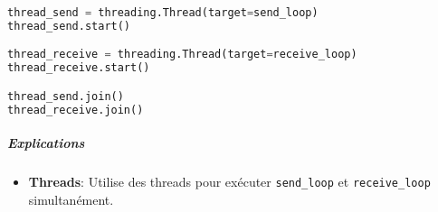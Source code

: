 \documentclass{article}
\begin{document}
\begin{lstlisting}[language=Python, caption=Utilisation des threads dans client.py]
thread_send = threading.Thread(target=send_loop)
thread_send.start()

thread_receive = threading.Thread(target=receive_loop)
thread_receive.start()

thread_send.join()
thread_receive.join()
\end{lstlisting}

\subparagraph{Explications}

\begin{itemize}
    \item \textbf{Threads}: Utilise des threads pour exécuter \texttt{send\_loop} et \texttt{receive\_loop} simultanément.
\end{itemize}
\end{document}

